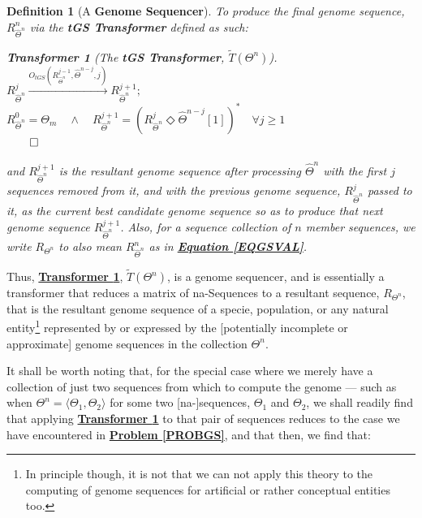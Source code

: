 \documentclass[a4paper, 18pt]{article} %
\newtheorem{defn}{Definition}
\newtheorem{transf}{Transformer}
\begin{document}
{\begin{minipage}{0.9\textwidth}
\begin{defn}[A \textbf{Genome Sequencer}]
To produce the final genome sequence, $R_{\hat{\Theta}^n}^{n}$ via the \textbf{tGS Transformer} defined as such:

\vspace{1em}
\begin{transf}[The \textbf{tGS Transformer}, $\tilde{T}(\Theta^n)$]
\label{TRANSFGENSEQ}
$ $\\
$R_{\hat{\Theta}^n}^{j}  \xrightarrow{O_{tGS}(R_{\hat{\Theta}^n}^{j-1}, \hat{\Theta}^{n-j},j)} R_{\hat{\Theta}^n}^{j+1};$\\
$R_{\hat{\Theta}^n}^{0} = \Theta_m \quad \land \quad R_{\hat{\Theta}^n}^{j+1} = ( R_{\hat{\Theta}^n}^j \Diamond \hat{\Theta}^{n-j}[1])^* \quad \forall j \geq 1$\\
$\qed$
\vspace{1em}

and $R_{\hat{\Theta}^n}^{j+1}$ is the resultant genome sequence after processing $\hat{\Theta}^n$ with the first $j$ sequences removed from it, and with the previous genome sequence, $R_{\hat{\Theta}^n}^j$ passed to it, as the current best candidate genome sequence so as to produce that next genome sequence $R_{\hat{\Theta}^n}^{j+1}$. Also, for a sequence collection of $n$ member sequences, we write $R_{\Theta^n}$ to also mean $R_{\hat{\Theta}^n}^{n}$ as in \textbf{\hyperref[EQGSVAL]{Equation \ref{EQGSVAL}}}.
\end{transf} 
\vspace{1em}

\end{defn}
\end{minipage}}
\vspace{2em}

Thus, \textbf{\hyperref[TRANSFGENSEQ]{Transformer \ref{TRANSFGENSEQ}}}, $\tilde{T}(\Theta^n)$, is a genome sequencer, and is essentially a transformer that reduces a matrix of na-Sequences to a resultant sequence, $R_{\Theta^n}$, that is the resultant genome sequence of a specie, population, or any natural entity\footnote{In principle though, it is not that we can not apply this theory to the computing of genome sequences for artificial or rather conceptual entities too.} represented by or expressed by the [potentially incomplete or approximate] genome sequences in the collection $\Theta^n$.

It shall be worth noting that, for the special case where we merely have a collection of just two sequences from which to compute the genome --- such as when $\Theta^n = \langle \Theta_1, \Theta_2 \rangle $ for some two [na-]sequences, $\Theta_1$ and $\Theta_2$, we shall readily find that applying \textbf{\hyperref[TRANSFGENSEQ]{Transformer \ref{TRANSFGENSEQ}}} to that pair of sequences reduces to the case we have encountered in \textbf{\hyperref[PROBGS]{Problem \ref{PROBGS}}}, and that then, we find that:
\end{document}
